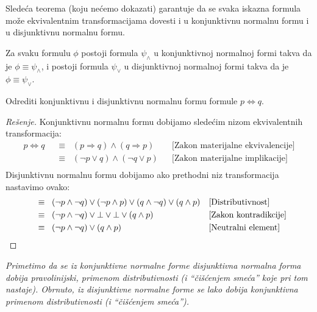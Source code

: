     Slede\'ca teorema (koju ne\'cemo dokazati) garantuje da se svaka iskazna formula mo\v ze ekvivalentnim
    transformacijama dovesti i u konjunktivnu normalnu formu i u disjunktivnu normalnu formu.
    
    \begin{THM}
      Za svaku formulu $\phi$ postoji formula $\psi_\land$ u konjunktivnoj normalnoj formi
      takva da je $\phi \equiv \psi_\land$, i postoji formula $\psi_\lor$
      u disjunktivnoj normalnoj formi takva da je $\phi \equiv \psi_\lor$.
    \end{THM}
    
    \begin{EX}
      Odrediti konjunktivnu i disjunktivnu normalnu formu formule \hbox{$p \Leftrightarrow q$}.
    \end{EX}
    \begin{proof}[Re\v senje]
      Konjunktivnu normalnu formu dobijamo slede\'cim nizom ekvivalentnih transformacija:
      \begin{align*}
        p \Leftrightarrow q
        &\;\;\equiv\;\; (p \Rightarrow q) \land (q \Rightarrow p)         && \text{[Zakon materijalne ekvivalencije]}\\
        &\;\;\equiv\;\; (\lnot p \lor q) \land (\lnot q \lor p)           && \text{[Zakon materijalne implikacije]}\\
      \end{align*}
      Disjunktivnu normalnu formu dobijamo ako prethodni niz transformacija nastavimo ovako:
      \begin{align*}
        &\;\;\equiv\;\; (\lnot p \land \lnot q) \lor (\lnot p \land p) \lor (q \land \lnot q) \lor (q \land p)   && \text{[Distributivnost]}\\
        &\;\;\equiv\;\; (\lnot p \land \lnot q) \lor \bot \lor \bot \lor (q \land p)                             && \text{[Zakon kontradikcije]}\\
        &\;\;\equiv\;\; (\lnot p \land \lnot q) \lor (q \land p)                                                 && \text{[Neutralni element] }\qedhere
      \end{align*}
    \end{proof}
    
    \begin{NAP}
      \textit{Primetimo da se iz konjunktivne normalne forme disjunktivna normalna forma dobija pravolinijski,
      primenom distributivnosti (i \enquote{\v ci\v s\'cenjem sme\'ca} koje
      pri tom nastaje). Obrnuto, iz disjunktivne normalne forme se lako dobija konjunktivna primenom distributivnosti
      (i \enquote{\v ci\v s\'cenjem sme\'ca}).}
    \end{NAP}

